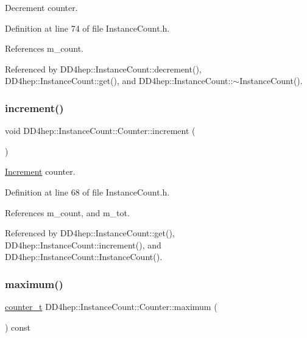 Decrement counter. 



Definition at line 74 of file Instance\+Count.\+h.



References m\+\_\+count.



Referenced by D\+D4hep\+::\+Instance\+Count\+::decrement(), D\+D4hep\+::\+Instance\+Count\+::get(), and D\+D4hep\+::\+Instance\+Count\+::$\sim$\+Instance\+Count().

\hypertarget{class_d_d4hep_1_1_instance_count_1_1_counter_aa127bfbbe011428fcbbeeaa7dfd25e1e}{}\label{class_d_d4hep_1_1_instance_count_1_1_counter_aa127bfbbe011428fcbbeeaa7dfd25e1e} 
\subsubsection{\texorpdfstring{increment()}{increment()}}
{\footnotesize\ttfamily void D\+D4hep\+::\+Instance\+Count\+::\+Counter\+::increment (\begin{DoxyParamCaption}{ }\end{DoxyParamCaption})\hspace{0.3cm}{\ttfamily [inline]}}



\hyperlink{struct_d_d4hep_1_1_increment}{Increment} counter. 



Definition at line 68 of file Instance\+Count.\+h.



References m\+\_\+count, and m\+\_\+tot.



Referenced by D\+D4hep\+::\+Instance\+Count\+::get(), D\+D4hep\+::\+Instance\+Count\+::increment(), and D\+D4hep\+::\+Instance\+Count\+::\+Instance\+Count().

\hypertarget{class_d_d4hep_1_1_instance_count_1_1_counter_a17fd35e34e2dd9bd76d6a4449b04630d}{}\label{class_d_d4hep_1_1_instance_count_1_1_counter_a17fd35e34e2dd9bd76d6a4449b04630d} 
\subsubsection{\texorpdfstring{maximum()}{maximum()}}
{\footnotesize\ttfamily \hyperlink{struct_d_d4hep_1_1_instance_count_ae81dc0c76b135425e14b6dc38262a727}{counter\+\_\+t} D\+D4hep\+::\+Instance\+Count\+::\+Counter\+::maximum (\begin{DoxyParamCaption}{ }\end{DoxyParamCaption}) const\hspace{0.3cm}{\ttfamily [inline]}}



